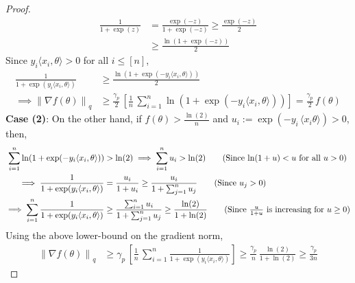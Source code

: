 \documentclass{article}
\newcommand{\norm}[1]{\left\|#1 \right\|}
\begin{document}
\begin{proof}
\begin{align*}
\frac{1}{1 + \exp(z)} & = \frac{\exp(-z)}{1 + \exp(-z)} \geq \frac{\exp(-z)}{2} \tag{For $z \geq 0$} \\
& \geq \frac{\ln(1+ \exp(-z))}{2} \tag{For all $z$, $\ln(1+z) \leq z$}
\end{align*}
Since $y_i \langle x_i, \theta \rangle > 0$ for all $i \leq [n]$, 
\begin{align*}
\frac{1}{1 + \exp(y_i \langle x_i, \theta \rangle)} & \geq \frac{\ln(1 + \exp(-y_i \langle x_i, \theta \rangle))}{2} \\
\implies \norm{\nabla f(\theta)}_q & \geq \frac{\gamma_p}{2} \, \left[ \frac{1}{n} \, \sum_{i = 1}^{n} \ln(1 + \exp(-y_i \langle x_i, \theta \rangle)) \right] = \frac{\gamma_p}{2} \, f(\theta) 
\end{align*}
\textbf{Case (2)}: On the other hand, if $f(\theta) > \frac{\ln(2)}{n}$ and $u_i := \exp(-y_i \, \langle x_i \theta \rangle) > 0$, then,  
\begin{align*}
\sum_{i = 1}^{n} \ln(1 + \exp(- y_i \langle x_i, \theta \rangle)) & > \ln(2) \implies \sum_{i = 1}^{n} u_i > \ln(2)  \tag{Since $\ln(1+u) < u$ for all $u > 0$} \\
\implies \frac{1}{1 + \exp(y_i \langle x_i, \theta \rangle)} &= \frac{u_i}{1 + u_i} \geq \frac{u_i}{1 + \sum_{j = 1}^{n} u_j} \tag{Since $u_j > 0$} \\
\implies \sum_{i = 1}^{n} \frac{1}{1 + \exp(y_i \langle x_i, \theta \rangle)} &\geq \frac{\sum_{i = 1}^{n} u_i}{1 + \sum_{j = 1}^n u_j} \geq \frac{\ln(2)}{1 + \ln(2)} \tag{Since $\frac{u}{1+u}$ is increasing for $u \geq 0$}
\end{align*}
Using the above lower-bound on the gradient norm, 
\begin{align*}
\norm{\nabla f(\theta)}_q & \geq \gamma_p \, \left[ \frac{1}{n} \, \sum_{i = 1}^{n} \frac{1}{1 + \exp(y_i \langle x_i, \theta \rangle)} \right] \geq \frac{\gamma_p}{n} \, \frac{\ln(2)}{1 + \ln(2)} \geq \frac{\gamma_p}{3n}
\end{align*}
\end{proof}
\end{document}
